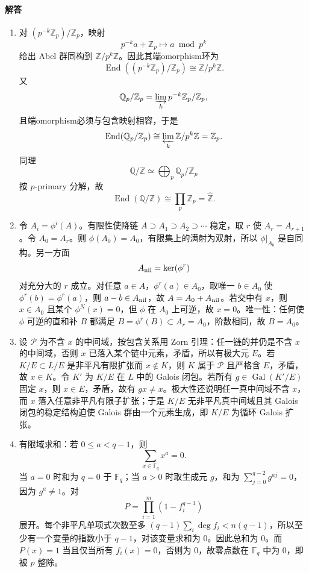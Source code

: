 \documentclass[UTF8,12pt]{ctexart}
\begin{document}
\paragraph{解答}
\begin{enumerate}[label=\textbf{\arabic*.},leftmargin=2.2em]
\item 对 \((p^{-k}\mathbb Z_p)/\mathbb Z_p\)，映射
\[
p^{-k}a+\mathbb Z_p\longmapsto a\bmod p^k
\]
给出 Abel 群同构到 \(\mathbb Z/p^k\mathbb Z\)。因此其端omorphism环为
\[
\operatorname{End}((p^{-k}\mathbb Z_p)/\mathbb Z_p)\cong \mathbb Z/p^k\mathbb Z .
\]
又
\[
\mathbb Q_p/\mathbb Z_p=\varinjlim_k p^{-k}\mathbb Z_p/\mathbb Z_p ,
\]
且端omorphism必须与包含映射相容，于是
\[
\operatorname{End}(\mathbb Q_p/\mathbb Z_p)\cong \varprojlim_k \mathbb Z/p^k\mathbb Z=\mathbb Z_p .
\]
同理
\[
\mathbb Q/\mathbb Z\simeq\bigoplus_p\mathbb Q_p/\mathbb Z_p
\]
按 \(p\)-primary 分解，故
\[
\operatorname{End}(\mathbb Q/\mathbb Z)\cong\prod_p\mathbb Z_p=\widehat{\mathbb Z}.
\]
\item 令 \(A_i=\phi^i(A)\)。有限性使降链 \(A\supset A_1\supset A_2\supset\cdots\) 稳定，取 \(r\) 使 \(A_r=A_{r+1}\)。令 \(A_0=A_r\)。则 \(\phi(A_0)=A_0\)，有限集上的满射为双射，所以 \(\phi|_{A_0}\) 是自同构。另一方面
\[
A_{\rm nil}=\ker(\phi^r)
\]
对充分大的 \(r\) 成立。对任意 \(a\in A\)，\(\phi^r(a)\in A_0\)，取唯一 \(b\in A_0\) 使 \(\phi^r(b)=\phi^r(a)\)，则 \(a-b\in A_{\rm nil}\)，故 \(A=A_0+A_{\rm nil}\)。若交中有 \(x\)，则 \(x\in A_0\) 且某个 \(\phi^N(x)=0\)，但 \(\phi\) 在 \(A_0\) 上可逆，故 \(x=0\)。唯一性：任何使 \(\phi\) 可逆的直和补 \(B\) 都满足 \(B=\phi^r(B)\subset A_r=A_0\)，阶数相同，故 \(B=A_0\)。
\item 设 \(\mathcal P\) 为不含 \(x\) 的中间域，按包含关系用 Zorn 引理：任一链的并仍是不含 \(x\) 的中间域，否则 \(x\) 已落入某个链中元素，矛盾，所以有极大元 \(E\)。若 \(K/E\subset L/E\) 是非平凡有限扩张而 \(x\notin K\)，则 \(K\) 属于 \(\mathcal P\) 且严格含 \(E\)，矛盾，故 \(x\in K\)。令 \(K'\) 为 \(K/E\) 在 \(L\) 中的 Galois 闭包。若所有 \(g\in\operatorname{Gal}(K'/E)\) 固定 \(x\)，则 \(x\in E\)，矛盾，故有 \(g x\ne x\)。极大性还说明任一真中间域不含 \(x\)，而 \(x\) 落入任意非平凡有限子扩张；于是 \(K/E\) 无非平凡真中间域且其 Galois 闭包的稳定结构迫使 Galois 群由一个元素生成，即 \(K/E\) 为循环 Galois 扩张。
\item 有限域求和：若 \(0\le a<q-1\)，则
\[
\sum_{x\in\mathbb F_q}x^a=0.
\]
当 \(a=0\) 时和为 \(q=0\) 于 \(\mathbb F_q\)；当 \(a>0\) 时取生成元 \(g\)，和为 \(\sum_{j=0}^{q-2}g^{aj}=0\)，因为 \(g^a\ne1\)。对
\[
P=\prod_{i=1}^m(1-f_i^{q-1})
\]
展开。每个非平凡单项式次数至多 \((q-1)\sum_i\deg f_i<n(q-1)\)，所以至少有一个变量的指数小于 \(q-1\)，对该变量求和为 \(0\)。因此总和为 \(0\)。而 \(P(x)=1\) 当且仅当所有 \(f_i(x)=0\)，否则为 \(0\)，故零点数在 \(\mathbb F_q\) 中为 \(0\)，即被 \(p\) 整除。

\end{enumerate}
\end{document}
